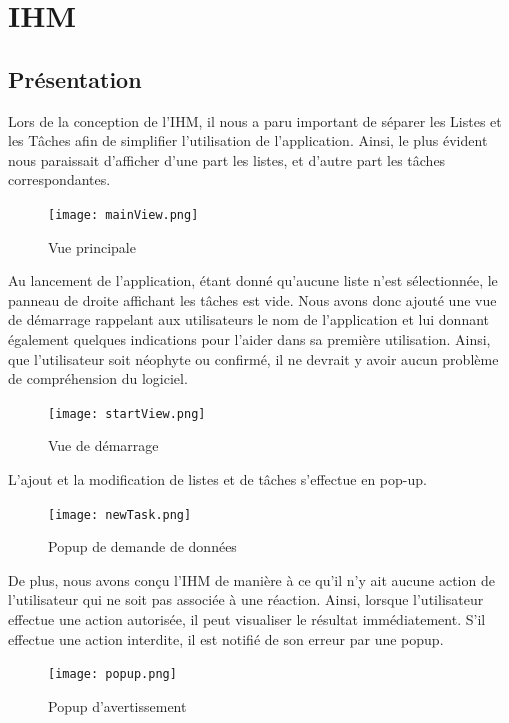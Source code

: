 \chapter{IHM}
	
	\section{Présentation}
	
		Lors de la conception de l'IHM, il nous a paru important de séparer les Listes et les Tâches afin de simplifier l'utilisation de l'application. Ainsi, le plus évident nous paraissait d'afficher d'une part les listes, et d'autre part les tâches correspondantes. 
		
		\begin{figure}[h!]
			\centering
			\texttt{[image: mainView.png]}
			\caption{Vue principale}
		\end{figure}
		\FloatBarrier
		
		Au lancement de l'application, étant donné qu'aucune liste n'est sélectionnée, le panneau de droite affichant les tâches est vide. Nous avons donc ajouté une vue de démarrage rappelant aux utilisateurs le nom de l'application et lui donnant également quelques indications pour l'aider dans sa première utilisation. Ainsi, que l'utilisateur soit néophyte ou confirmé, il ne devrait y avoir aucun problème de compréhension du logiciel.
		
		\begin{figure}[h!]
			\centering
			\texttt{[image: startView.png]}
			\caption{Vue de démarrage}
		\end{figure}
		\FloatBarrier
		
		L'ajout et la modification de listes et de tâches s'effectue en pop-up.
		
		\begin{figure}[h!]
			\centering
		 	\texttt{[image: newTask.png]}
			\caption{Popup de demande de données}
		\end{figure}
		\FloatBarrier
		
		
		De plus, nous avons conçu l'IHM de manière à ce qu'il n'y ait aucune action de l'utilisateur qui ne soit pas associée à une réaction. Ainsi, lorsque l'utilisateur effectue une action autorisée, il peut visualiser le résultat immédiatement. S'il effectue une action interdite, il est notifié de son erreur par une popup.
		
		\begin{figure}[h!]
			\centering
		   \texttt{[image: popup.png]}
		   \caption{Popup d'avertissement}
		\end{figure}
		\FloatBarrier
		
